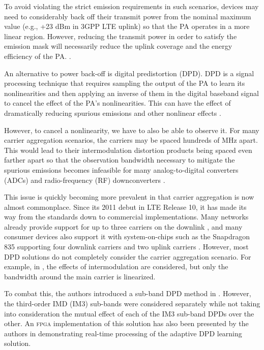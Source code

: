 To avoid violating the strict emission requirements in such scenarios, devices may need to considerably back off their transmit power from the nominal maximum value (e.g., +23 dBm in 3GPP LTE uplink) so that the PA operates in a more linear region. 
However, reducing the transmit power in order to satisfy the emission mask will necessarily reduce the uplink coverage and the energy efficiency of the PA. 
 \cite{P.RoblinJan.2008,J.KimJan.2013,S.A.BassamAug.2012,ICASSP2014,Commag_abdelaziz,Katz16}. 

An alternative to power back-off is digital predistortion (DPD). 
DPD is a signal processing technique that requires sampling the output of the PA to learn its nonlinearities and then applying an inverse of them in the digital baseband signal to cancel the effect of the PA's nonlinearities. 
This can have the effect of dramatically reducing spurious emissions and other nonlinear effects \cite{Katz16}.

However, to cancel a nonlinearity, we have to also be able to observe it. For many carrier aggregation scenarios, the carriers may be spaced hundreds of MHz apart. 
This would lead to their intermodulation distortion products being spaced even farther apart so that the observation bandwidth necessary to mitigate the spurious emissions becomes infeasible for many analog-to-digital converters (ADCs) and radio-frequency (RF) downconverters \cite{S.A.BassamOct.2011}. 

This issue is quickly becoming more prevalent in that carrier aggregation is now almost commonplace. Since its 2011 debut in LTE Release 10, it has made its way from the standards down to commercial implementations. Many networks already provide support for up to three carriers on the downlink \cite{AT&T}, and many consumer devices also support it with system-on-chips such as the Snapdragon 835 supporting four downlink carriers and two uplink carriers \cite{Qual835}. 
However, most DPD solutions do not completely consider the carrier aggregation scenario. 
For example, in \cite{S.A.BassamOct.2011}, the effects of intermodulation are considered, but only the bandwidth around the main carrier is linearized. 

To combat this, the authors introduced a sub-band DPD method in \cite{ICASSP2014}. 
However, the third-order IMD (IM3) sub-bands were considered separately while not taking into consideration the mutual effect of each of the IM3 sub-band DPDs over the other. 
An \textsc{fpga} implementation of this solution has also been presented by the authors in \cite{Asilomar2015} demonstrating real-time processing of the adaptive DPD learning solution.

